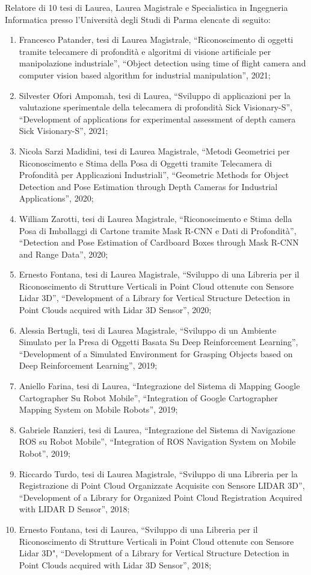 \documentclass[11pt]{article}
\begin{document}
Relatore di 10 tesi di Laurea, Laurea Magistrale e Specialistica in Ingegneria Informatica presso l'Universit\`a degli Studi di Parma elencate di seguito: 
\begin{enumerate}
\item Francesco Patander, tesi di Laurea Magistrale, ``Riconoscimento di oggetti tramite telecamere di profondità e algoritmi di visione artificiale per manipolazione industriale'', 
   ``Object detection using time of flight camera and computer vision based algorithm for industrial manipulation'', 2021;
\item Silvester Ofori Ampomah, tesi di Laurea, ``Sviluppo di applicazioni per la valutazione sperimentale della telecamera di profondità Sick Visionary-S'',
``Development of applications for experimental assessment of depth camera Sick Visionary-S'', 2021; 
\item Nicola Sarzi Madidini, tesi di Laurea Magistrale, ``Metodi Geometrici per Riconoscimento e Stima della Posa di Oggetti tramite Telecamera di Profondità per Applicazioni Industriali'', 
   ``Geometric Methods for Object Detection and Pose Estimation through Depth Cameras for Industrial Applications'', 2020;
\item William Zarotti, tesi di Laurea Magistrale, ``Riconoscimento e Stima della Posa di Imballaggi di Cartone tramite Mask R-CNN e Dati di Profondità'', 
   ``Detection and Pose Estimation of Cardboard Boxes through Mask R-CNN and Range Data'', 2020;
\item Ernesto Fontana, tesi di Laurea Magistrale, ``Sviluppo di una Libreria per il Riconoscimento di Strutture Verticali in Point Cloud ottenute con Sensore Lidar 3D'', 
   ``Development of a Library for Vertical Structure Detection in Point Clouds acquired with Lidar 3D Sensor'', 2020;
\item Alessia Bertugli, tesi di Laurea Magistrale, ``Sviluppo di un Ambiente Simulato per la Presa di Oggetti Basata Su Deep Reinforcement Learning'', 
   ``Development of a Simulated Environment for Grasping Objects based on Deep Reinforcement Learning'', 2019;
\item Aniello Farina, tesi di Laurea, ``Integrazione del Sistema di Mapping Google Cartographer Su Robot Mobile'', 
  ``Integration of Google Cartographer Mapping System on Mobile Robots'', 2019;
\item Gabriele Ranzieri, tesi di Laurea, ``Integrazione del Sistema di Navigazione ROS su Robot Mobile'', ``Integration of ROS Navigation System on Mobile Robot'', 2019;
\item Riccardo Turdo, tesi di Laurea Magistrale, ``Sviluppo di una Libreria per la Registrazione di Point Cloud Organizzate Acquisite con Sensore LIDAR 3D'',
  ``Development of a Library for Organized Point Cloud Registration Acquired with LIDAR D Sensor'', 2018;
\item Ernesto Fontana, tesi di Laurea, ``Sviluppo di una Libreria per il Riconoscimento di Strutture Verticali in Point Cloud ottenute con Sensore Lidar 3D", 
   ``Development of a Library for Vertical Structure Detection in Point Clouds acquired with Lidar 3D Sensor'', 2018;
\end{enumerate}
\end{document}
